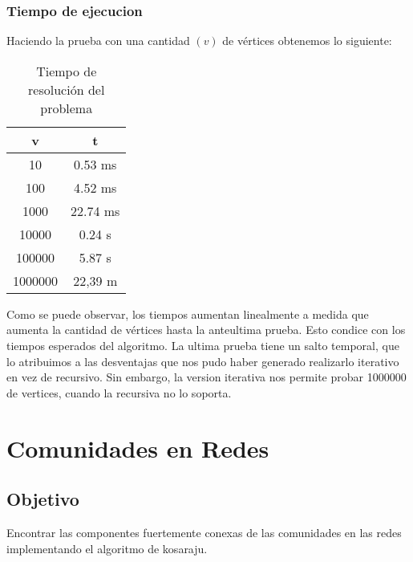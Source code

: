 \documentclass{article}
\begin{document}
            \subsubsection{Tiempo de ejecucion}
                Haciendo la prueba con una cantidad $(v)$ de vértices obtenemos lo siguiente:
                \begin{table}[h!]
                    \centering
                    \caption{Tiempo de resolución del problema}
                    \begin{tabular}{c|c}
                        v & t \\
                        \hline
                        10 & 0.53 ms \\
                        \hline
                        100 & 4.52 ms \\
                        \hline
                        1000 & 22.74 ms \\
                        \hline
                        10000 & 0.24 s \\
                        \hline
                        100000 & 5.87 s \\
                        \hline
                        1000000 & 22,39 m
                    \end{tabular}
                \end{table}

                Como se puede observar, los tiempos aumentan linealmente a medida
                que aumenta la cantidad de vértices hasta la anteultima prueba.
                Esto condice con los tiempos esperados del algoritmo. La ultima prueba
                tiene un salto temporal, que lo atribuimos a las desventajas que nos
                pudo haber generado realizarlo iterativo en vez de recursivo. Sin
                embargo, la version iterativa nos permite probar 1000000 de vertices,
                cuando la recursiva no lo soporta.


    \section{Comunidades en Redes}
        \subsection{Objetivo}
          Encontrar las componentes fuertemente conexas de las comunidades en las
          redes implementando el algoritmo de kosaraju.
\end{document}
